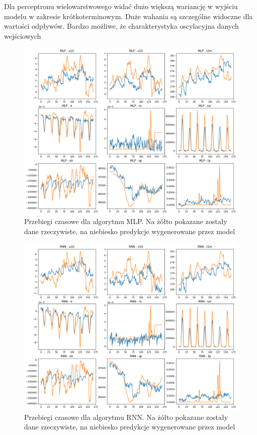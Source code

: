 Dla perceptronu wielowarstwowego widać dużo większą wariancję w wyjściu modelu 
w zakresie krótkoterminowym. Duże wahania są szczególne widoczne dla wartości odpływów.
Bardzo możliwe, że charakterystyka oscylacyjna danych wejściowych  

\begin{figure}[H]
    \centering
    \includegraphics[width=\textwidth]{images/MLP_week.png}
    \caption{Przebiegi czasowe dla algorytmu MLP. Na żółto pokazane zostały dane 
    rzeczywiste, na niebiesko predykcje wygenerowane przez model}
    \label{mlp-week}
\end{figure}

\begin{figure}[H]
    \centering
    \includegraphics[width=\textwidth]{images/rnn_week.png}
    \caption{Przebiegi czasowe dla algorytmu RNN. Na żółto pokazane zostały dane 
    rzeczywiste, na niebiesko predykcje wygenerowane przez model}
    \label{rnn-week}
\end{figure}

